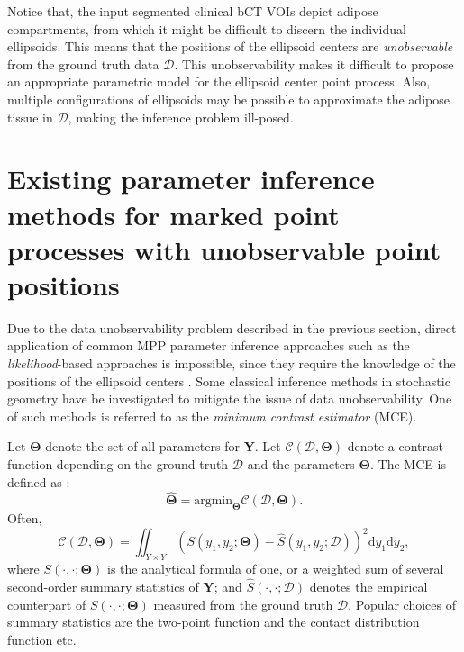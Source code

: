 \documentclass[journal]{IEEEtran}
\newcommand{\dd}[1]{\mathrm{d}#1}%
\begin{document}
Notice that, the input segmented clinical bCT VOIs depict adipose
compartments, from which it might be difficult to discern the
individual ellipsoids. This means that the positions of the ellipsoid
centers are \textit{unobservable} from the ground truth data
$\mathcal{D}$. This unobservability makes it difficult to propose an
appropriate parametric model for the ellipsoid center point
process. Also, multiple configurations of ellipsoids may be possible
to approximate the adipose tissue in $\mathcal{D}$, making the
inference problem ill-posed.

\section{Existing parameter inference methods for marked point
  processes with unobservable point positions}
\label{sec:exist-param-infer}

Due to the data unobservability problem described in the previous
section, direct application of common MPP parameter inference
approaches such as the \textit{likelihood}-based approaches
\cite{moller2003statistical} \cite{baddeley2000practical}
\cite{besag1975statistical} \cite{jensen1991pseudolikelihood} is
impossible, since they require the knowledge of the positions of the
ellipsoid centers \cite{dereudre2014estimation}. Some classical
inference methods in stochastic geometry have be investigated to
mitigate the issue of data unobservability. One of such methods is
referred to as the \textit{minimum contrast estimator} (MCE).

Let $\mathbf{\Theta}$ denote the set of all parameters for
$\mathbf{Y}$. Let $\mathcal{C}(\mathcal{D}, \mathbf{\Theta})$ denote a
contrast function depending on the ground truth $\mathcal{D}$ and the
parameters $\mathbf{\Theta}$. The MCE is defined as
\cite{chiu2013stochastic}:
\begin{equation}
  \label{eq:min-const}
  \hat{\mathbf{\Theta}} =
  \text{argmin}_{\mathbf{\Theta}}
  \mathcal{C}(\mathcal{D}, \mathbf{\Theta}).
\end{equation}
Often,
\begin{equation}
  \label{eq:min-often}
  \mathcal{C}(\mathcal{D}, \mathbf{\Theta}) = \iint_{Y \times Y}
  \left( S(y_1, y_2; \mathbf{\Theta}) - \hat{S}(y_1, y_2;
    \mathcal{D}) \right)^2 \dd y_1 \dd y_2,
\end{equation}
where $S(\cdot, \cdot; \mathbf{\Theta})$ is the analytical formula of
one, or a weighted sum of several second-order summary statistics of
$\mathbf{Y}$; and $\hat{S}(\cdot, \cdot; \mathcal{D})$ denotes the
empirical counterpart of $S(\cdot, \cdot; \mathbf{\Theta})$ measured
from the ground truth $\mathcal{D}$. Popular choices of summary
statistics are the two-point function \cite{diggle1981binary} and the
contact distribution function \cite {heinrich1993asymptotic} etc.
\end{document}
